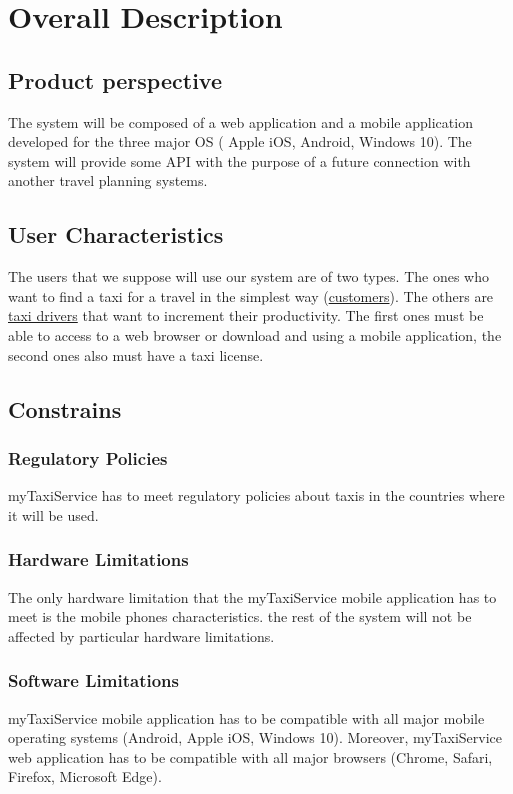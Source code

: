 \chapter{Overall Description}
	
	\section{Product perspective}
	The system will be composed of a web application and a mobile application developed for the three major OS ( Apple iOS, Android, Windows 10). The system will provide some API with the purpose of a future connection with another travel planning systems. 
		
	\section{User Characteristics}
	The users that we suppose will use our system are of two types. The ones who want to find a taxi for a travel in the simplest way (\hyperref[sec:customer]{customers}). The others are \hyperref[sec:tdriver]{taxi drivers} that want to increment their productivity. The first ones must be able to access to a web browser or download and using a mobile application, the second ones also must have a taxi license.
		
	\section{Constrains}
		
		\subsection{Regulatory Policies}
		myTaxiService  has to meet regulatory policies about taxis in the countries where it will be used.

		\subsection{Hardware Limitations}
		The only hardware limitation that the myTaxiService mobile application has to meet is the mobile phones characteristics. the rest of the 			system will not be affected by particular hardware limitations.

		\subsection{Software Limitations}
		myTaxiService mobile application has to be compatible with all major mobile operating systems (Android, Apple iOS, Windows 10).
		Moreover, myTaxiService web application has to be compatible with all major browsers (Chrome, Safari, Firefox, Microsoft Edge).

